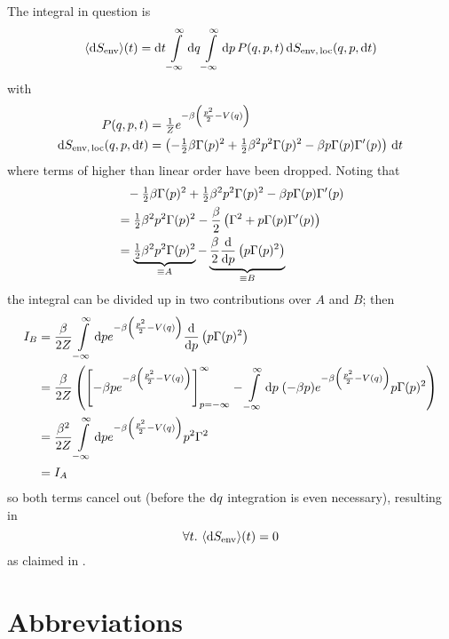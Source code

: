 The integral in question is
%
\begin{equation}
	\langle\mathrm{d}S_\text{env}\rangle(t)
	= \mathrm{d} t \int\limits_{-\infty}^\infty\mathrm{d} q\int\limits_{-\infty}^\infty\mathrm{d} p\, P(q, p, t) \, \mathrm{d}S_\text{env,\,loc}(q, p, \mathrm{d} t)
\end{equation}
%
with
%
\begin{align}
	P(q,p,t) &= \tfrac1Ze^{-\beta\left(\frac{p^2}2-V(q)\right)} \\
	\mathrm{d}S_\text{env,\,loc}(q,p,\mathrm{d} t) &= \left(
		- \tfrac12\beta\Gamma(p)^2
		+ \tfrac12\beta^2p^2\Gamma(p)^2
		- \beta p\Gamma(p)\Gamma'(p)
		\right)\,\mathrm{d} t
\end{align}
%
where terms of higher than linear order have been dropped. Noting that
%
\begin{align}
	&\phantom{=} - \tfrac12\beta\Gamma(p)^2
		+ \tfrac12\beta^2p^2\Gamma(p)^2
		- \beta p\Gamma(p)\Gamma'(p) \\
	&= \tfrac12\beta^2p^2\Gamma(p)^2
		- \frac\beta2\left(
		\Gamma^2+p\Gamma(p)\Gamma'(p)
		\right) \\
	&= \underbrace{\tfrac12\beta^2p^2\Gamma(p)^2}_{\equiv A}
		- \underbrace{\frac\beta2\frac{\mathrm{d} }{\mathrm{d} p}\left(p\Gamma(p)^2\right)}_{\equiv B}
\end{align}
%
the integral can be divided up in two contributions over \(A\) and \(B\); then
%
\begin{equation}\begin{split}
	I_B &= \frac\beta{2Z} \int\limits_{-\infty}^\infty\mathrm{d} p e^{-\beta\left(\frac{p^2}2-V(q)\right)} \frac{\mathrm{d} }{\mathrm{d} p}\left(p\Gamma(p)^2\right) \\
	&= \frac\beta{2Z}\left(\left[ -\beta p e^{-\beta\left(\frac{p^2}2-V(q)\right)} \right]_{p = -\infty}^\infty - \int\limits_{-\infty}^\infty\mathrm{d} p \; (-\beta p) e^{-\beta\left(\frac{p^2}2-V(q)\right)} p\Gamma(p)^2\right) \\
	&= \frac{\beta^2}{2Z} \int\limits_{-\infty}^\infty\mathrm{d} p e^{-\beta\left(\frac{p^2}2-V(q)\right)} p^2\Gamma^2 \\
	&= I_A
\end{split}\end{equation}
%
so both terms cancel out (before the \(\mathrm{d} q\) integration is even necessary), resulting in
%
\begin{equation}
	\forall t. ~ \langle\mathrm{d}S_\text{env}\rangle(t) = 0
\end{equation}
%
as claimed in .









\section{Abbreviations}


